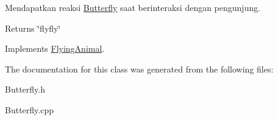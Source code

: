 Mendapatkan reaksi \hyperlink{classButterfly}{Butterfly} saat berinteraksi dengan pengunjung. 

\begin{DoxyReturn}{Returns}
\char`\"{}flyfly\char`\"{} 
\end{DoxyReturn}


Implements \hyperlink{classFlyingAnimal_ac0eee625fa2235eee8cbdc0a010ae430}{Flying\-Animal}.



The documentation for this class was generated from the following files\-:\begin{DoxyCompactItemize}
\item 
Butterfly.\-h\item 
Butterfly.\-cpp\end{DoxyCompactItemize}
